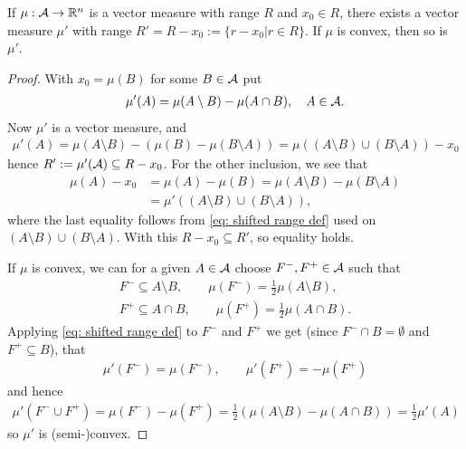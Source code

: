 \begin{lemma}\label{lem: shifted measure}
If $\mu:\mathcal{A} \to \mathbb{R}^{n}$ is a vector measure with range $R$ and $x_{0}\in R$, there exists a vector measure $\mu'$ with range $R'=R-x_{0}:=\{r-x_{0} | r\in R\}$. If $\mu$ is convex, then so is $\mu'$.
\end{lemma}
\begin{proof}
With $x_{0}=\mu(B)$ for some $B\in \mathcal{A}$ put
\begin{align}
	\mu'(A)=\mu(A\setminus B) - \mu(A\cap B), \quad A\in \mathcal{A}. \label{eq: shifted range def}
\end{align}
Now $\mu'$ is a vector measure, and
\begin{align*}
	\mu'(A)=\mu(A\setminus B) - (\mu(B) - \mu(B\setminus A)) = \mu((A\setminus B) \cup (B\setminus A)) - x_{0}
\end{align*}
hence $R':=\mu'(\mathcal{A})\subseteq R-x_{0}$. For the other inclusion, we see that
\begin{align*}
	\mu(A)-x_{0}&=\mu(A)-\mu(B)=\mu(A\setminus B) - \mu(B\setminus A) \\
	&=\mu'((A\setminus B) \cup (B\setminus A)),
\end{align*}
where the last equality follows from \eqref{eq: shifted range def} used on $(A\setminus B) \cup (B\setminus A)$. With this $R-x_{0}\subseteq R'$, so equality holds.

If $\mu$ is convex, we can for a given $A\in \mathcal{A}$ choose $F^{-}, F^{+}\in \mathcal{A}$ such that
\begin{align*}
	F^{-}\subseteq A\setminus B, \qquad \mu(F^{-})=\frac{1}{2}\mu(A\setminus B), \\
	F^{+}\subseteq A\cap B, \qquad \mu(F^{+})=\frac{1}{2}\mu(A\cap B).
\end{align*}
Applying \eqref{eq: shifted range def} to $F^{-}$ and $F^{+}$ we get (since $F^{-}\cap B=\emptyset$ and $F^{+}\subseteq B$), that
\begin{align*}
	\mu'(F^{-})=\mu(F^{-}), \qquad \mu'(F^{+})=-\mu(F^{+})
\end{align*}
and hence
\begin{align*}
	\mu'(F^{-}\cup F^{+})=\mu(F^{-})-\mu(F^{+})=\frac{1}{2}(\mu(A\setminus B) - \mu(A\cap B))=\frac{1}{2}\mu'(A)
\end{align*}
so $\mu'$ is (semi-)convex.
\end{proof}

